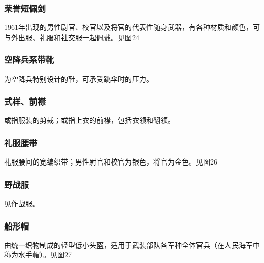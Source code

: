\subsubsection*{荣誉短佩剑}%

1961年出现的男性尉官、校官以及将官的代表性随身武器，有各种材质和颜色，可与外出服、礼服和社交服一起佩戴。见图24

\subsubsection*{空降兵系带靴}%

为空降兵特别设计的鞋，可承受跳伞时的压力。

\subsubsection*{式样、前襟}%

或指服装的剪裁；或指上衣的前襟，包括衣领和翻领。

\subsubsection*{礼服腰带}%

礼服腰间的宽编织带；男性尉官和校官为银色，将官为金色。见图26

\subsubsection*{野战服}%

见作战服。

\subsubsection*{船形帽}%

由统一织物制成的轻型低小头盔，适用于武装部队各军种全体官兵（在人民海军中称为水手帽）。见图27

